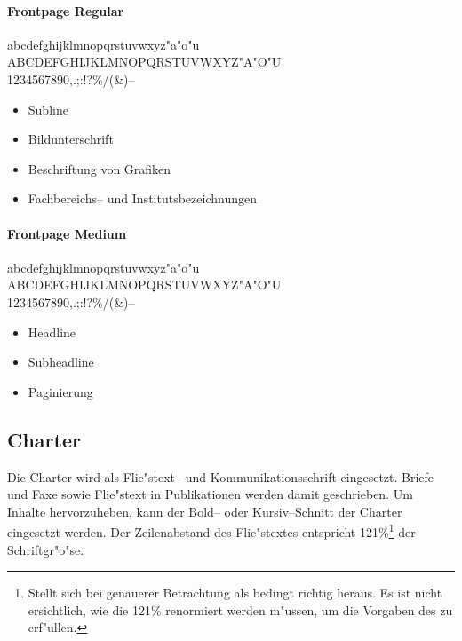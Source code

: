 \documentclass[twoside,colorback,accentcolor=tud4c,11pt]{tudreport}
\begin{document}
    \paragraph{Frontpage Regular}
      \hfill%
      \begin{minipage}{\textwidth-\the\parindent}
        \sublinefont\normalsize
        \noindent
        abcdefghijklmnopqrstuvwxyz"a"o"u\\
        ABCDEFGHIJKLMNOPQRSTUVWXYZ"A"O"U\\
        1234567890,.;:!?\glqq\grqq@\texteuro\%/(\&)--
      \end{minipage}
      \begin{itemize}
        \item Subline
        \item Bildunterschrift
        \item Beschriftung von Grafiken
        \item Fachbereichs-- und Institutsbezeichnungen
      \end{itemize}

    \paragraph{Frontpage Medium}
      \hfill%
      \begin{minipage}{\textwidth-\the\parindent}
        \headfont\normalsize
        \noindent
        abcdefghijklmnopqrstuvwxyz"a"o"u\\
        ABCDEFGHIJKLMNOPQRSTUVWXYZ"A"O"U\\
        1234567890,.;:!?\glqq\grqq@\texteuro\%/(\&)--
      \end{minipage}
      \begin{itemize}
        \item Headline
        \item Subheadline
        \item Paginierung
      \end{itemize}

  \subsection{Charter}
    Die Charter wird als Flie"stext-- und Kommunikationsschrift eingesetzt.
    Briefe und Faxe sowie Flie"stext in Publikationen werden damit geschrieben.
    Um Inhalte hervorzuheben, kann der Bold-- oder Kursiv--Schnitt der Charter eingesetzt werden.
    Der Zeilenabstand des Flie"stextes entspricht 121\%\footnote{Stellt sich bei genauerer 
    Betrachtung als bedingt richtig heraus. Es ist nicht ersichtlich, wie die 121\%
    renormiert werden m"ussen, um die Vorgaben des  zu
    erf"ullen.} der Schriftgr"o"se.
\end{document}
